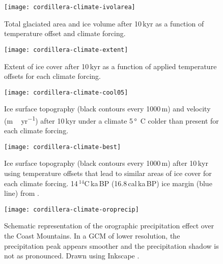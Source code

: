 \begin{figure}[t]
	\vspace*{2mm}
	\begin{center}
		\texttt{[image: cordillera-climate-ivolarea]}
	\end{center}
	\caption{Total glaciated area and ice volume after 10\,kyr as a function of temperature offset and climate forcing.}
	\label{fig:ivolarea}
\end{figure}

\begin{figure*}[t]
	\vspace*{2mm}
	\begin{center}
		\texttt{[image: cordillera-climate-extent]}
	\end{center}
	\caption{Extent of ice cover after 10\,kyr as a function of applied temperature offsets for each climate forcing.}
	\label{fig:extent}
\end{figure*}

\begin{figure*}[t]
	\vspace*{2mm}
	\begin{center}
		\texttt{[image: cordillera-climate-cool05]}
	\end{center}
	\caption{Ice surface topography (black contours every 1000\,m) and velocity (\unit{m\,yr^{-1}}) after 10\,kyr under a climate 5\,\unit{\degree C} colder than present for each climate forcing.}
	\label{fig:cool05}
\end{figure*}

\begin{figure*}[t]
	\vspace*{2mm}
	\begin{center}
		\texttt{[image: cordillera-climate-best]}
	\end{center}
	\caption{Ice surface topography (black contours every 1000\,m) after 10\,kyr using temperature offsets that lead to similar areas of ice cover for each climate forcing. 14\,$^{14}$C\,ka\,BP (16.8\,cal\,ka\,BP) ice margin (blue line) from \citet{dyke-2004}.}
	\label{fig:best}
\end{figure*}

\begin{figure}[t]
	\vspace*{2mm}
	\begin{center}
		\texttt{[image: cordillera-climate-oroprecip]}
	\end{center}
	\caption{Schematic representation of the orographic precipitation effect over the Coast Mountains. In a GCM of lower resolution, the precipitation peak appears smoother and the precipitation shadow is not as pronounced. Drawn using Inkscape \citep{web:inkscape}.}
	\label{fig:oroprecip}
\end{figure}
